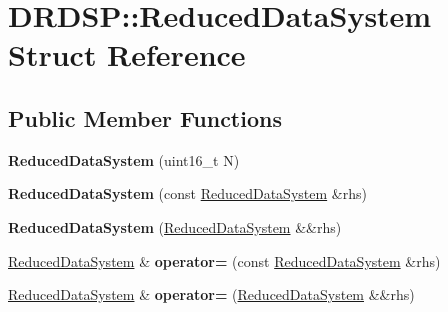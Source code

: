 \hypertarget{struct_d_r_d_s_p_1_1_reduced_data_system}{\section{D\-R\-D\-S\-P\-:\-:Reduced\-Data\-System Struct Reference}
\label{struct_d_r_d_s_p_1_1_reduced_data_system}
}
\subsection*{Public Member Functions}
\begin{DoxyCompactItemize}
\item 
\hypertarget{struct_d_r_d_s_p_1_1_reduced_data_system_a221e3299337151b91fc071ca3f84beb6}{{\bfseries Reduced\-Data\-System} (uint16\-\_\-t N)}\label{struct_d_r_d_s_p_1_1_reduced_data_system_a221e3299337151b91fc071ca3f84beb6}

\item 
\hypertarget{struct_d_r_d_s_p_1_1_reduced_data_system_aea103d77b8ad01f186bbd163a2e432cf}{{\bfseries Reduced\-Data\-System} (const \hyperlink{struct_d_r_d_s_p_1_1_reduced_data_system}{Reduced\-Data\-System} \&rhs)}\label{struct_d_r_d_s_p_1_1_reduced_data_system_aea103d77b8ad01f186bbd163a2e432cf}

\item 
\hypertarget{struct_d_r_d_s_p_1_1_reduced_data_system_adc4e39a9893446b6ad8937bd59bf1b0f}{{\bfseries Reduced\-Data\-System} (\hyperlink{struct_d_r_d_s_p_1_1_reduced_data_system}{Reduced\-Data\-System} \&\&rhs)}\label{struct_d_r_d_s_p_1_1_reduced_data_system_adc4e39a9893446b6ad8937bd59bf1b0f}

\item 
\hypertarget{struct_d_r_d_s_p_1_1_reduced_data_system_af7cd9e3ec1cfadacf761d46fe7f21672}{\hyperlink{struct_d_r_d_s_p_1_1_reduced_data_system}{Reduced\-Data\-System} \& {\bfseries operator=} (const \hyperlink{struct_d_r_d_s_p_1_1_reduced_data_system}{Reduced\-Data\-System} \&rhs)}\label{struct_d_r_d_s_p_1_1_reduced_data_system_af7cd9e3ec1cfadacf761d46fe7f21672}

\item 
\hypertarget{struct_d_r_d_s_p_1_1_reduced_data_system_a91dac8fb109401713b827a327400b164}{\hyperlink{struct_d_r_d_s_p_1_1_reduced_data_system}{Reduced\-Data\-System} \& {\bfseries operator=} (\hyperlink{struct_d_r_d_s_p_1_1_reduced_data_system}{Reduced\-Data\-System} \&\&rhs)}\label{struct_d_r_d_s_p_1_1_reduced_data_system_a91dac8fb109401713b827a327400b164}


\end{DoxyCompactItemize}
